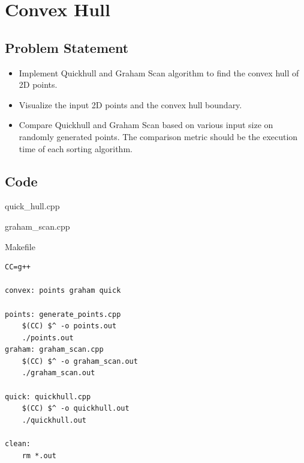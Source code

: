 \section{Convex Hull}
\subsection{Problem Statement}
\begin{itemize}
    \item Implement Quickhull and Graham Scan algorithm to find the convex hull of 2D points. 
    \item Visualize the input 2D points and the convex hull boundary. 
    \item Compare Quickhull and Graham Scan based on various input size on randomly
        generated points.  The comparison metric should be the execution time of 
        each sorting algorithm.
\end{itemize}
\subsection{Code}
\begin{code}
    \caption{quick\_hull.cpp}
    \label{code:quickhull}
\end{code}

\begin{code}
    \caption{graham\_scan.cpp}
    \label{code:graham}
\end{code}
\begin{code}
    \caption{Makefile}
\begin{verbatim}
CC=g++

convex: points graham quick

points: generate_points.cpp
	$(CC) $^ -o points.out
	./points.out
graham:	graham_scan.cpp
	$(CC) $^ -o graham_scan.out
	./graham_scan.out

quick: quickhull.cpp
	$(CC) $^ -o quickhull.out
	./quickhull.out

clean:
	rm *.out
    \end{verbatim}
\end{code}


